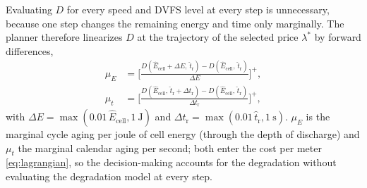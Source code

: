 Evaluating $D$ for every speed and \ac{DVFS} level at every step is unnecessary, because one
step changes the remaining energy and time only marginally. The planner therefore linearizes $D$
at the trajectory of the selected price $\lambda^\ast$ by forward differences,
\begin{equation}
\begin{aligned}
  \mu_E &= \Big[\tfrac{D(\hat E_{\mathrm{cell}} + \Delta E,\, \hat t_{\mathrm{r}}) - D(\hat E_{\mathrm{cell}},\, \hat t_{\mathrm{r}})}{\Delta E}\Big]^+, \\
  \mu_t &= \Big[\tfrac{D(\hat E_{\mathrm{cell}},\, \hat t_{\mathrm{r}} + \Delta t_{\mathrm{r}}) - D(\hat E_{\mathrm{cell}},\, \hat t_{\mathrm{r}})}{\Delta t_{\mathrm{r}}}\Big]^+,
\end{aligned}
  \label{eq:deg_prices}
\end{equation}
with $\Delta E = \max(0.01\,\hat E_{\mathrm{cell}}, 1~\mathrm{J})$ and
$\Delta t_{\mathrm{r}} = \max(0.01\,\hat t_{\mathrm{r}}, 1~\mathrm{s})$. $\mu_E$ is the
marginal cycle aging per joule of cell energy (through the depth of discharge) and $\mu_t$ the
marginal calendar aging per second; both enter the cost per meter \eqref{eq:lagrangian}, so the
decision-making accounts for the degradation without evaluating the degradation model at every step.

